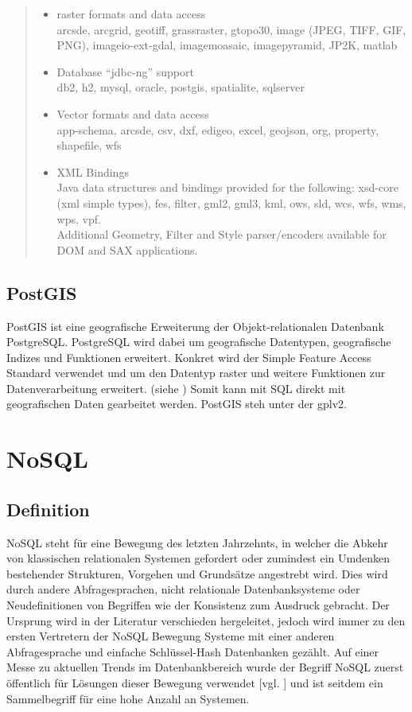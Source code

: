 \begin{quote}
\begin{itemize}
\item raster formats and data access\\
arcsde, arcgrid, geotiff, grassraster, gtopo30, image (JPEG, TIFF, GIF, PNG), imageio-ext-gdal, imagemoasaic, imagepyramid, JP2K, matlab
\item Database “jdbc-ng” support\\
db2, h2, mysql, oracle, postgis, spatialite, sqlserver
\item Vector formats and data access\\
app-schema, arcsde, csv, dxf, edigeo, excel, geojson, org, property, shapefile, wfs
\item XML Bindings\\
Java data structures and bindings provided for the following: xsd-core (xml simple types), fes, filter, gml2, gml3, kml, ows, sld, wcs, wfs, wms, wps, vpf.\\
Additional Geometry, Filter and Style parser/encoders available for DOM and SAX applications.
\end{itemize}
\end{quote}


\subsection{PostGIS}
PostGIS ist eine geografische Erweiterung der Objekt-relationalen Datenbank PostgreSQL.
PostgreSQL wird dabei um geografische Datentypen, geografische Indizes und Funktionen erweitert.
Konkret wird der Simple Feature Access Standard verwendet und um den Datentyp raster und weitere Funktionen zur Datenverarbeitung erweitert. (siehe \cite{website:postgisdocu-opengis})
Somit kann mit SQL direkt mit geografischen Daten gearbeitet werden.
PostGIS steh unter der \Gls{gpl}v2.



\section{NoSQL}
\label{nosql}
\subsection{Definition}

NoSQL steht für eine Bewegung des letzten Jahrzehnts, in welcher die Abkehr von klassischen relationalen Systemen gefordert oder zumindest ein Umdenken bestehender Strukturen, Vorgehen und Grundsätze angestrebt wird.
Dies wird durch andere Abfragesprachen, nicht relationale Datenbanksysteme oder Neudefinitionen von Begriffen wie der Konsistenz zum Ausdruck gebracht.
Der Ursprung wird in der Literatur verschieden hergeleitet, jedoch wird immer zu den ersten Vertretern der NoSQL Bewegung Systeme mit einer anderen Abfragesprache und einfache Schlüssel-Hash Datenbanken gezählt.
Auf einer Messe zu aktuellen Trends im Datenbankbereich wurde der Begriff NoSQL zuerst öffentlich für Lösungen dieser Bewegung verwendet [vgl. \cite{website:originnosql}] und ist seitdem ein Sammelbegriff für eine hohe Anzahl an Systemen.

